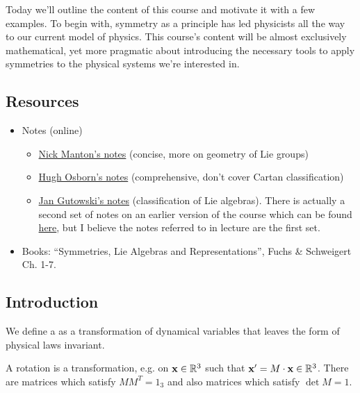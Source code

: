 Today we'll outline the content of this course and motivate it with a few examples. To begin with, symmetry as a principle has led physicists all the way to our current model of physics. This course's content will be almost exclusively mathematical, yet more pragmatic about introducing the necessary tools to apply symmetries to the physical systems we're interested in.

\subsection*{Resources}
\begin{itemize}
    \item Notes (online)
    \begin{itemize}
        \item \href{http://www.damtp.cam.ac.uk/user/examples/3P2.pdf}{Nick Manton's notes} (concise, more on geometry of Lie groups)
        \item \href{http://www.damtp.cam.ac.uk/user/examples/3P2Lb.pdf}{Hugh Osborn's notes} (comprehensive, don't cover Cartan classification)
        \item \href{http://www.damtp.cam.ac.uk/user/examples/3P2Lc.pdf}{Jan Gutowski's notes} (classification of Lie algebras). There is actually a second set of notes on an earlier version of the course which can be found \href{http://personal.maths.surrey.ac.uk/st/jg0033/Resources/lectnotes(master).pdf}{here}, but I believe the notes referred to in lecture are the first set.
    \end{itemize}
    \item Books: ``Symmetries, Lie Algebras and Representations'', Fuchs \& Schweigert Ch. 1-7.
\end{itemize}

\subsection*{Introduction}
\begin{defn}
We define a  as a transformation of dynamical variables that leaves the form of physical laws invariant.
\end{defn}
\begin{exm}
A rotation is a transformation, e.g. on $\boldsymbol{\mathbf{x}}\in \mathbb{R}^3$ such that $\boldsymbol{\mathbf{x}}'=M\cdot \boldsymbol{\mathbf{x}} \in \mathbb{R}^3$. There are  matrices which satisfy $MM^T = 1_3$ and also  matrices which satisfy $\det M = 1$.
\end{exm}

